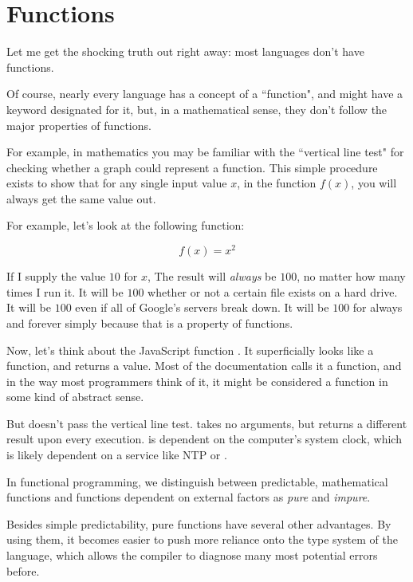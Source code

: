\chapter{Functions}

Let me get the shocking truth out right away: most languages don't have functions.  

Of course, nearly every language has a concept of a ``function", and might have a keyword designated for it, but, in a mathematical sense, they don't follow the major properties of functions.  

For example, in mathematics you may be familiar with the ``vertical line test" for checking whether a graph could represent a function. This simple procedure exists to show that for any single input value $ x $, in the function $f\left(x\right)$, you will always get the same value out.  

For example, let's look at the following function: 

$$ f\left( x \right) = x ^ 2 $$ 

If I supply the value $ 10 $ for $ x $, The result will \textit{always} be $ 100 $, no matter how many times I run it.  It will be $ 100 $ whether or not a certain file exists on a hard drive. It will be $100$ even if all of Google's servers break down.  It will be $100$ for always and forever simply because that is a property of functions. 

Now, let's think about the JavaScript function .  It superficially looks like a function, and returns a value.  Most of the documentation calls it a function, and in the way most programmers think of it, it might be considered a function in some kind of abstract sense. 

But  doesn't pass the vertical line test.  takes no arguments, but returns a different result upon every execution.   is dependent on the computer's system clock, which is likely dependent on a service like NTP or . 

In functional programming, we distinguish between predictable, mathematical functions and functions dependent on external factors as \textit{pure} and \textit{impure}.  

Besides simple predictability, pure functions have several other advantages.  By using them, it becomes easier to push more reliance onto the type system of the language, which allows the compiler to diagnose many most potential errors before. 
